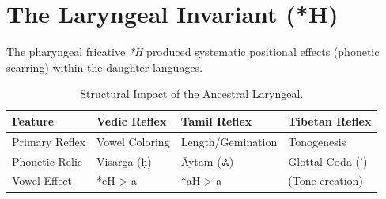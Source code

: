 \section{The Laryngeal Invariant (*H)}
The pharyngeal fricative \textit{*H} produced systematic positional effects (phonetic scarring) within the daughter languages.
\begin{table}[h]
\centering
\begin{tabular}{llll} \toprule
\textbf{Feature} & \textbf{Vedic Reflex} & \textbf{Tamil Reflex} & \textbf{Tibetan Reflex} \\ \midrule
Primary Reflex & Vowel Coloring & Length/Gemination & Tonogenesis \\
Phonetic Relic & Visarga (\d{h}) & \={A}ytam (ஃ) & Glottal Coda (') \\
Vowel Effect & *eH > \={a} & *aH > \={a} & (Tone creation) \\ \bottomrule
\end{tabular}
\caption{Structural Impact of the Ancestral Laryngeal.}
\end{table}
